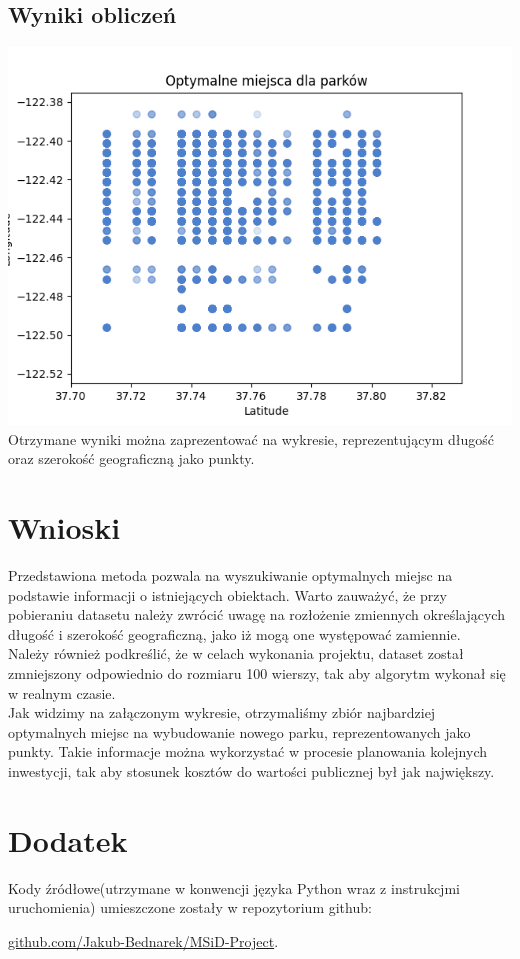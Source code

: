 \documentclass[10pt]{article}
\begin{document}
\subsection{Wyniki obliczeń}
\includegraphics[width = 15cm]{images/plots/optimal_parks.png}
\newline 
Otrzymane wyniki można zaprezentować na wykresie, reprezentującym długość oraz szerokość geograficzną jako punkty.
\section{Wnioski}
Przedstawiona metoda pozwala na wyszukiwanie optymalnych miejsc na podstawie informacji o istniejących obiektach. Warto zauważyć, że przy pobieraniu datasetu należy zwrócić uwagę na rozłożenie zmiennych określających długość i szerokość geograficzną, jako iż mogą one występować zamiennie.\\
Należy również podkreślić, że w celach wykonania projektu, dataset został zmniejszony odpowiednio do rozmiaru 100 wierszy, tak aby algorytm wykonał się w realnym czasie.\\
Jak widzimy na załączonym wykresie, otrzymaliśmy zbiór najbardziej optymalnych miejsc na wybudowanie nowego parku, reprezentowanych jako punkty. Takie informacje można wykorzystać w procesie planowania kolejnych inwestycji, tak aby stosunek kosztów do wartości publicznej był jak największy.

\appendix
\section{Dodatek}
Kody źródłowe(utrzymane w konwencji języka Python wraz z instrukcjmi uruchomienia) umieszczone zostały w repozytorium github:

\noindent \url{github.com/Jakub-Bednarek/MSiD-Project}.
\end{document}
